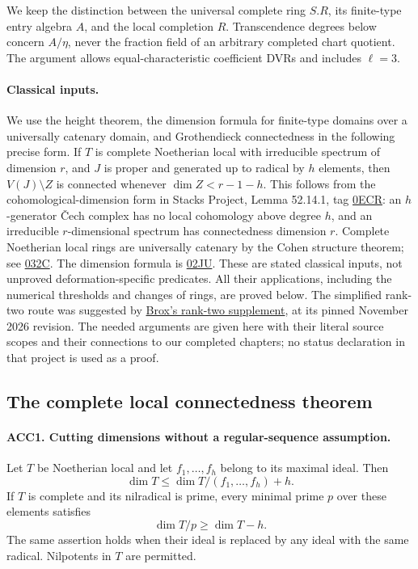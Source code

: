 \documentclass[11pt,a4paper]{article}
\numberwithin{equation}{section}
\theoremstyle{remark}\newtheorem{remark}[theorem]{Remark}
\begin{document}
We keep the distinction between the universal complete ring \(S.R\),
its finite-type entry algebra \(A\), and the local completion \(R\).
Transcendence degrees below concern \(A/\eta\), never the fraction
field of an arbitrary completed chart quotient.  The argument allows
equal-characteristic coefficient DVRs and includes \(\ell=3\).

\paragraph{Classical inputs.}
We use the height theorem, the dimension formula for finite-type
domains over a universally catenary domain, and Grothendieck
connectedness in the following precise form.  If \(T\) is complete
Noetherian local with irreducible spectrum of dimension \(r\), and
\(J\) is proper and generated up to radical by \(h\) elements, then
\(V(J)\setminus Z\) is connected whenever
\(\dim Z<r-1-h\).  This follows from the cohomological-dimension
form in Stacks Project, Lemma 52.14.1, tag
\href{https://stacks.math.columbia.edu/tag/0ECR}{0ECR}:
an \(h\)-generator \v Cech complex has no local cohomology above
degree \(h\), and an irreducible \(r\)-dimensional spectrum has
connectedness dimension \(r\).  Complete Noetherian local rings are
universally catenary by the Cohen structure theorem; see
\href{https://stacks.math.columbia.edu/tag/032C}{032C}.
The dimension formula is
\href{https://stacks.math.columbia.edu/tag/02JU}{02JU}.
These are stated classical inputs, not unproved deformation-specific
predicates.  All their applications, including the numerical thresholds
and changes of rings, are proved below.  The simplified rank-two route
was suggested by
\href{https://github.com/JoseBrox/GRH_distillation/blob/fd38313e5c7018c3c988ba20510e6b0b3bca0519/paper/shared/selmer-support-continuation-rank-two.tex}
{Brox's rank-two supplement}, at its pinned November 2026 revision.
The needed arguments are given here with their literal source scopes
and their connections to our completed chapters; no status declaration
in that project is used as a proof.

\subsection{The complete local connectedness theorem}

\paragraph{ACC1. Cutting dimensions without a regular-sequence assumption.}
\label{claim:ACC1}
Let \(T\) be Noetherian local and let \(f_1,\ldots,f_h\)
belong to its maximal ideal.  Then
\[
 \dim T\le \dim T/(f_1,\ldots,f_h)+h.                    \tag{ACC.3}
\]
If \(T\) is complete and its nilradical is prime, every minimal
prime \(p\) over these elements satisfies
\[
                        \dim T/p\ge \dim T-h.            \tag{ACC.4}
\]
The same assertion holds when their ideal is replaced by any ideal
with the same radical.  Nilpotents in \(T\) are permitted.
\end{document}
